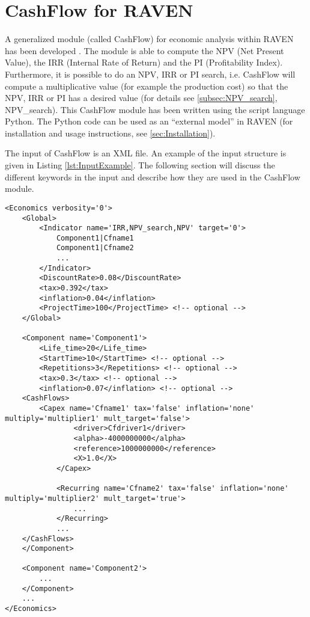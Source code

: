 \section{CashFlow for RAVEN}
A generalized module (called CashFlow) for economic analysis within RAVEN has been developed \cite{MSApril2017}. The module is able to compute
the NPV (Net Present Value), the IRR (Internal Rate of Return) and the PI (Profitability Index). Furthermore, it is possible to
do an NPV, IRR or PI search, i.e. CashFlow will compute a multiplicative value (for example the production cost) so that the
NPV, IRR or PI has a desired value (for details see \ref{subsec:NPV_search}, NPV\_search). This CashFlow module has been written using the script language Python.
The Python code can be used as an “external model” in RAVEN (for installation and usage instructions, see \ref{sec:Installation}).

The input of CashFlow is an XML file. An example of the input structure is given in Listing \ref{lst:InputExample}. The following section will discuss the
 different keywords in the input and describe how they are used in the CashFlow module.

\begin{lstlisting}[style=XML,morekeywords={anAttribute},caption=Economics input example., label=lst:InputExample]
<Economics verbosity='0'>
    <Global>
        <Indicator name='IRR,NPV_search,NPV' target='0'>
            Component1|Cfname1
            Component1|Cfname2
            ...
        </Indicator>
        <DiscountRate>0.08</DiscountRate>
        <tax>0.392</tax>
        <inflation>0.04</inflation>
        <ProjectTime>100</ProjectTime> <!-- optional -->
    </Global>

    <Component name='Component1'>
        <Life_time>20</Life_time>
        <StartTime>10</StartTime> <!-- optional -->
        <Repetitions>3</Repetitions> <!-- optional -->
        <tax>0.3</tax> <!-- optional -->
        <inflation>0.07</inflation> <!-- optional -->
	<CashFlows>
	    <Capex name='Cfname1' tax='false' inflation='none' multiply='multiplier1' mult_target='false'>
    	        <driver>Cfdriver1</driver>
                <alpha>-4000000000</alpha>
                <reference>1000000000</reference>
                <X>1.0</X>
            </Capex>

            <Recurring name='Cfname2' tax='false' inflation='none' multiply='multiplier2' mult_target='true'>
                ...
            </Recurring>
            ...
	</CashFlows>
    </Component>

    <Component name='Component2'>
        ...
    </Component>
    ...
</Economics>
\end{lstlisting}

